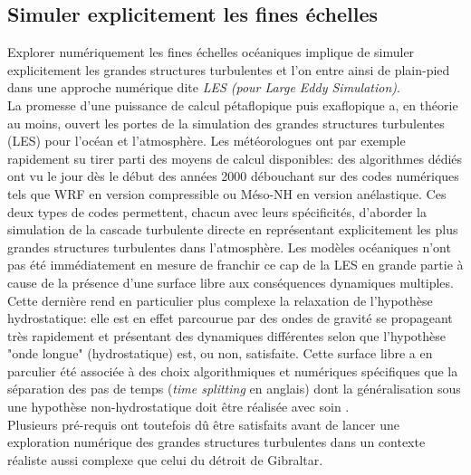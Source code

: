 \subsection{Simuler explicitement les fines échelles}
\color{blue}
Explorer numériquement les fines échelles océaniques implique de simuler explicitement les grandes structures turbulentes et l'on entre ainsi de plain-pied dans une approche numérique dite \textit{LES (pour \textit{Large Eddy Simulation})}.\\
La promesse d’une puissance de calcul pétaflopique puis exaflopique a, en théorie au moins, ouvert les portes de la simulation des grandes structures turbulentes (LES) pour l’océan et l’atmosphère. Les météorologues ont par exemple rapidement su tirer parti des moyens de calcul disponibles: des algorithmes dédiés ont vu le jour dès le début des années 2000 débouchant sur des codes numériques tels que WRF \citep{skamarock_prototypes_2001} en version compressible ou Méso-NH \citep{lac_overview_2018} en version anélastique. Ces deux types de codes permettent, chacun avec leurs spécificités, d’aborder la simulation de la cascade turbulente directe en représentant explicitement les plus grandes structures turbulentes dans l’atmosphère.
Les modèles océaniques n’ont pas été immédiatement en mesure de franchir ce cap de la LES en grande partie à cause de la présence d’une surface libre aux conséquences dynamiques multiples. Cette dernière rend en particulier plus complexe la relaxation de l’hypothèse hydrostatique: elle est en effet parcourue par des ondes de gravité se propageant très rapidement et présentant des dynamiques différentes selon que l'hypothèse "onde longue" (hydrostatique) est, ou non, satisfaite. Cette surface libre a en parculier été associée à des choix algorithmiques et numériques spécifiques que la séparation des pas de temps (\textit{time splitting} en anglais) dont la généralisation sous une hypothèse non-hydrostatique doit être réalisée avec soin \citep{auclair_non-hydrostatic_2011,auclair_non-hydrostatic_2018}.\\
Plusieurs pré-requis ont toutefois dû être satisfaits avant de lancer une exploration numérique des grandes structures turbulentes dans un contexte réaliste aussi complexe que celui du détroit de Gibraltar.
